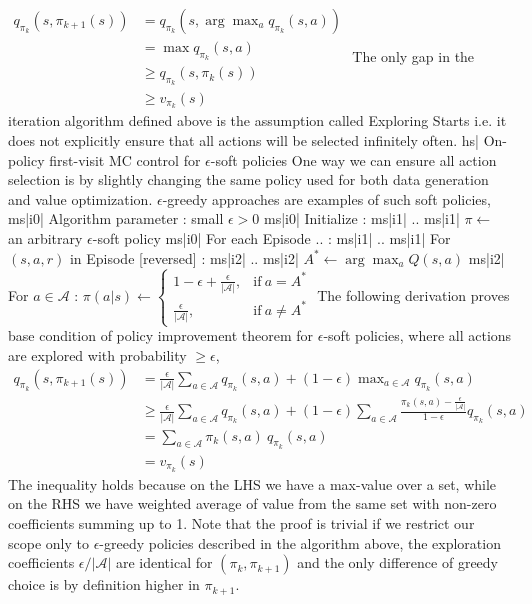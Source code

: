 \( \begin{aligned} q_{\pi_k} (s, \pi_{k+1}(s)) &= q_{\pi_k} (s, \arg\max_a q_{\pi_k} (s, a)) \\ &= \max q_{\pi_k} (s, a) \\ &\ge q_{\pi_k} (s, \pi_k(s)) \\ &\ge v_{\pi_k} (s) \end{aligned} \)
The only gap in the iteration algorithm defined above is the assumption called Exploring Starts i.e. it does not explicitly ensure that all actions will be selected infinitely often.
hs| On-policy first-visit MC control for \(\epsilon\)-soft policies
One way we can ensure all action selection is by slightly changing the same policy used for both data generation and value optimization. \(\epsilon\)-greedy approaches are examples of such soft policies,
ms|i0| Algorithm parameter : small \( \epsilon >0 \)
ms|i0| Initialize :
ms|i1| ..
ms|i1| \(\pi \leftarrow\) an arbitrary \(\epsilon\)-soft policy
ms|i0| For each Episode .. :
ms|i1| ..
ms|i1| For \( (s,a,r) \) in Episode [reversed] :
ms|i2| ..
ms|i2| \( A^* \leftarrow \arg\max_a Q(s, a) \)
ms|i2| For \(a \in \mathcal{A}\) : \( \pi(a | s) \leftarrow \begin{cases} 1 - \epsilon + \frac{\epsilon}{|\mathcal{A}|}, & \text{if} \ a = A^* \\ \frac{\epsilon}{|\mathcal{A}|}, & \text{if} \ a \neq A^* \end{cases} \)
The following derivation proves base condition of policy improvement theorem for \( \epsilon \)-soft policies, where all actions are explored with probability \(\ge \epsilon \),
\( \begin{aligned} q_{\pi_k}(s, \pi_{k+1}(s)) &= \frac{\epsilon}{|\mathcal{A}|} \sum_{a \in \mathcal{A}} q_{\pi_k}(s, a) + (1 - \epsilon) \max_{a \in \mathcal{A}} q_{\pi_k}(s,a) \\ &\ge \frac{\epsilon}{|\mathcal{A}|} \sum_{a \in \mathcal{A}} q_{\pi_k}(s, a) + (1 - \epsilon) \sum_{a \in \mathcal{A}} \frac{\pi_k(s, a) - \frac{\epsilon}{|\mathcal{A}|}}{1 - \epsilon} q_{\pi_k}(s, a) \\ &= \sum_{a \in \mathcal{A}} \pi_k(s, a) \ q_{\pi_k}(s, a) \\ &= v_{\pi_k}(s) \end{aligned} \)
The inequality holds because on the LHS we have a max-value over a set, while on the RHS we have weighted average of value from the same set with non-zero coefficients summing up to 1.
Note that the proof is trivial if we restrict our scope only to \( \epsilon \)-greedy policies described in the algorithm above, the exploration coefficients \( \epsilon/|\mathcal{A}| \) are identical for \( (\pi_k, \pi_{k+1}) \) and the only difference of greedy choice is by definition higher in \( \pi_{k+1} \).
